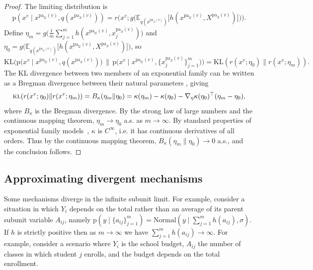 \documentclass[12pt]{article}
\newcommand{\Sc}{\mathcal{S}}
\newcommand{\Uc}{\mathcal{U}}
\newcommand{\pa}{\mathrm{pa}}
\newcommand{\pr}{\mathrm{p}}
\begin{document}
\begin{proof}
The limiting distribution is
\begin{equation}
	\pr(x^v \mid x^{\pa_\Uc(v)}, q(x^{\pa_\Sc(v)})) = r\Big(x^v ; g\Big (\mathbb{E}_{q(x^{\pa_\Sc(v)})} \big[h(x^{\pa_\mathcal{U}(v)}, X^{\pa_\mathcal{S}(v)})\big]\Big)\Big).
\end{equation}
Define $\eta_m = g\big (\frac{1}{m}\sum_{j=1}^m h(x^{\pa_\mathcal{U}(v)}, x_j^{\pa_\mathcal{S}(v)})\big) $ and $\eta_0 = g\big (\mathbb{E}_{q(x^{\pa_\Sc(v)})} \big[h(x^{\pa_\mathcal{U}(v)}, X^{\pa_\mathcal{S}(v)})\big]\big)$, so
\begin{equation}
	\mathrm{KL}\Big(\pr\big(x^{v} \mid x^{\pa_\mathcal{U}(v)}, q(x^{\pa_\mathcal{S}(v)})\big)\, \big\| \, \pr\big(x^v \mid x^{\pa_\mathcal{U}(v)}, \{x_{j}^{\pa_\mathcal{S}(v)}\}_{j =1}^m\big)\Big) = \mathrm{KL}(r(x^v ; \eta_0) \| r(x^v ; \eta_m)).
\end{equation}
The KL divergence between two members of an exponential family can be written as a Bregman divergence between their natural parameters \citep[e.g.][]{nielsen2009statistical}, giving
\begin{equation}
        \textsc{kl}(r(x^v ; \eta_0) \| r(x^v ; \eta_m)) = B_\kappa(\eta_m \| \eta_0) = \kappa(\eta_m) - \kappa(\eta_0) - \nabla_\eta \kappa(\eta_0)^\top (\eta_m - \eta_0),
\end{equation}
where $B_\kappa$ is the Bregman divergence. By the strong law of large numbers and the continuous mapping theorem, $\eta_m \to \eta_0$ a.s. as $m \to \infty$.
By standard properties of exponential family models~\citep[e.g.][Prop. 19]{Miller2014-je}, $\kappa$ is $C^\infty$, i.e. it has continuous derivatives of all orders. Thus by the continuous mapping theorem, $B_\kappa(\eta_m \| \eta_0) \to 0$ a.s., and the conclusion follows.
\end{proof}

\subsection{Approximating divergent mechanisms} \label{sec:approx_diverge}

Some mechanisms diverge in the infinite subunit limit. 
For example, consider a situation in which $Y_i$ depends on the total rather than an average of its parent subunit variable $A_{ij}$, namely $\pr(y \mid \{a_{ij}\}_{j=1}^m) = \mathrm{Normal}(y \mid \sum_{j=1}^m h(a_{ij}), \sigma)$.
If $h$ is strictly positive then as $m \to \infty$ we have $ \sum_{j=1}^m h(a_{ij}) \to \infty$.
For example, consider a scenario where $Y_i$ is the school budget, $A_{ij}$ the number of classes in which student $j$ enrolls, and the budget depends on the total enrollment.
\end{document}
